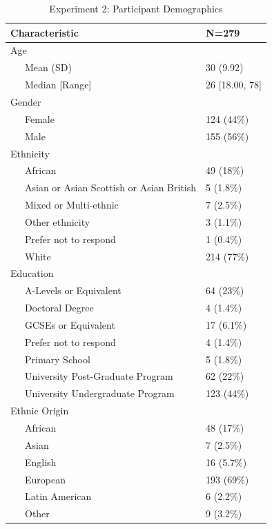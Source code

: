 \documentclass[
  donotrepeattitle,doc, 12pt, a4paper,floatsintext]{apa7}
\begin{document}
\begin{table}[h]

\begin{center}
\begin{threeparttable}

\caption{\label{tab:Experiment 2: Participant Demographics}Experiment 2: Participant Demographics}

\begin{tabular}{ll}
\toprule
Characteristic & N=279\\
\midrule
Age & \\
\ \ \ Mean (SD) & 30 (9.92)\\
\ \ \ Median [Range] & 26 [18.00, 78]\\
Gender & \\
\ \ \ Female & 124 (44\%)\\
\ \ \ Male & 155 (56\%)\\
Ethnicity & \\
\ \ \ African & 49 (18\%)\\
\ \ \ Asian  or  Asian Scottish  or  Asian British & 5 (1.8\%)\\
\ \ \ Mixed  or  Multi-ethnic & 7 (2.5\%)\\
\ \ \ Other ethnicity & 3 (1.1\%)\\
\ \ \ Prefer not  to respond & 1 (0.4\%)\\
\ \ \ White & 214 (77\%)\\
Education & \\
\ \ \ A-Levels  or  Equivalent & 64 (23\%)\\
\ \ \ Doctoral  Degree & 4 (1.4\%)\\
\ \ \ GCSEs  or  Equivalent & 17 (6.1\%)\\
\ \ \ Prefer not  to respond & 4 (1.4\%)\\
\ \ \ Primary School & 5 (1.8\%)\\
\ \ \ University  Post-Graduate  Program & 62 (22\%)\\
\ \ \ University  Undergraduate  Program & 123 (44\%)\\
Ethnic Origin & \\
\ \ \ African & 48 (17\%)\\
\ \ \ Asian & 7 (2.5\%)\\
\ \ \ English & 16 (5.7\%)\\
\ \ \ European & 193 (69\%)\\
\ \ \ Latin American & 6 (2.2\%)\\
\ \ \ Other & 9 (3.2\%)\\
\bottomrule
\end{tabular}

\end{threeparttable}
\end{center}

\end{table}
\end{document}
